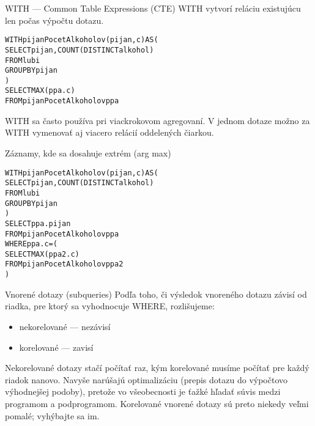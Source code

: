 \documentclass[12pt]{beamer}
\def\blue#1{\textcolor{Cerulean}{#1}}
\begin{document}
\begin{frame}[fragile]{WITH --- Common Table Expressions (CTE)}
WITH vytvorí reláciu existujúcu len počas výpočtu dotazu.
\bigskip
\begin{alltt}
\alert{WITH} \blue{pijanPocetAlkoholov}(pijan, c) AS (
    SELECT pijan, COUNT(DISTINCT alkohol)
    FROM lubi
    GROUP BY pijan
)
SELECT MAX(ppa.c)
FROM \blue{pijanPocetAlkoholov} ppa
\end{alltt}
\bigskip
WITH sa často používa pri viackrokovom agregovaní.
V jednom dotaze možno za WITH vymenovať aj viacero relácií oddelených čiarkou.
\end{frame}

\begin{frame}[fragile]{Záznamy, kde sa dosahuje extrém (arg max)}
\begin{alltt}
\alert{WITH} \blue{pijanPocetAlkoholov}(pijan, c) AS (
    SELECT pijan, COUNT(DISTINCT alkohol)
    FROM lubi
    GROUP BY pijan
)
SELECT ppa.pijan
FROM \blue{pijanPocetAlkoholov} ppa
WHERE ppa.c = (
    SELECT MAX(ppa2.c)
    FROM \blue{pijanPocetAlkoholov} ppa2
)
\end{alltt}
\bigskip
\end{frame}

\begin{frame}[fragile]{Vnorené dotazy (subqueries)}
Podľa toho, či výsledok vnoreného dotazu závisí od riadka, pre ktorý sa vyhodnocuje WHERE, rozlišujeme:
\begin{itemize}
\item \alert{nekorelované} --- nezávisí
\item \alert{korelované} --- zavisí
\end{itemize}
Nekorelované dotazy stačí počítať raz, kým korelované musíme počítať pre každý riadok nanovo.
Navyše narúšajú optimalizáciu (prepis dotazu do výpočtovo výhodnejšej podoby), 
pretože vo všeobecnosti je ťažké hľadať súvis medzi programom a podprogramom.
Korelované vnorené dotazy sú preto niekedy veľmi pomalé; vyhýbajte sa im.
\end{frame}
\end{document}

